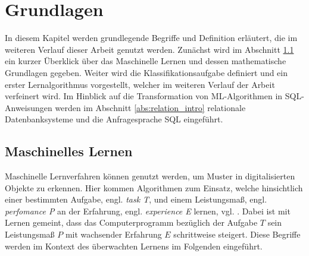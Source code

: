 \chapter{Grundlagen}
\label{kap:fund}
In diesem Kapitel werden grundlegende Begriffe und Definition erläutert, die im weiteren Verlauf dieser Arbeit genutzt werden. Zunächst wird im Abschnitt \ref{abs:mathe_intro} ein kurzer Überklick über das Maschinelle Lernen und dessen mathematische Grundlagen gegeben. Weiter wird die Klassifikationsaufgabe definiert und ein erster Lernalgorithmus vorgestellt, welcher im weiteren Verlauf der Arbeit verfeinert wird. Im Hinblick auf die Transformation von ML-Algorithmen in SQL-Anweisungen werden im Abschnitt \ref{abs:relation_intro} relationale Datenbanksysteme und die Anfragesprache SQL eingeführt.
\section{Maschinelles Lernen}
\label{abs:mathe_intro}
Maschinelle Lernverfahren können genutzt werden, um Muster in digitalisierten Objekte zu erkennen. Hier kommen Algorithmen zum Einsatz, welche hinsichtlich einer bestimmten Aufgabe, engl. \textit{task T}, und einem Leistungsmaß, engl. \textit{perfomance P} an der Erfahrung, engl. \textit{experience E} lernen, vgl. \cite{mitchell1997machine}. Dabei ist mit Lernen gemeint, dass das Computerprogramm bezüglich der Aufgabe $T$ sein
Leistungsmaß $P$ mit wachsender Erfahrung $E$ schrittweise steigert. Diese Begriffe werden im Kontext des überwachten Lernens im Folgenden eingeführt.

